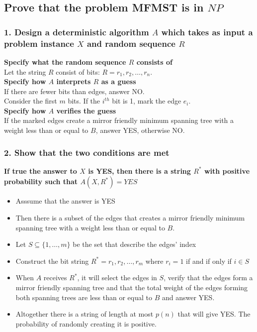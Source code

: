 \documentclass[12pt]{report}
\begin{document}
\subsection{Prove that the problem MFMST is in $NP$}
\subsubsection{1. Design a deterministic algorithm $A$ which takes as input a problem instance $X$ and random sequence $R$}

\textbf{Specify what the random sequence $R$ consists of}\\
Let the string $R$ consist of bits: $R = r_1,r_2,\dots,r_n$.\\

\textbf{Specify how $A$ interprets $R$ as a guess}\\
If there are fewer bits than edges, answer NO.\\
Consider the first $m$ bits. If the $i^{th}$ bit is 1, mark the edge $e_i$.\\

\textbf{Specify how $A$ verifies the guess}\\
If the marked edges create a mirror friendly minimum spanning tree with a weight less than or equal to $B$, answer YES, otherwise NO.

\subsubsection{2. Show that the two conditions are met}
\textbf{If true the answer to $X$ is YES, then there is a string $R^*$ with positive probability such that $A(X, R^*) = YES$}
\begin{itemize}
	\item[] Asssume that the answer is YES
	
	\item[] Then there is a subset of the edges that creates a mirror friendly minimum spanning tree with a weight less than or equal to $B$.
	
	\item[] Let $S \subseteq \{1,\dots,m\}$ be the set that describe the edges' index
	
	\item[] Construct the bit string $R^* = r_1,r_2,\dots,r_m$ where $r_i = 1$ if and if only if $i \in S$
	
	\item[] When $A$ receives $R^*$, it will select the edges in $S$, verify that the edges form a mirror friendly spanning tree and that the total weight of the edges forming both spanning trees are less than or equal to $B$ and answer YES.
	
	\item[] Altogether there is a string of length at most $p(n)$ that will give YES. The probability of randomly creating it is positive.
\end{itemize}
\end{document}
